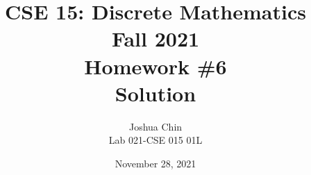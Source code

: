 \documentclass[11pt]{article}
\begin{document}
\author{Joshua Chin\\
Lab 021-CSE 015 01L}

\title{CSE 15: Discrete Mathematics\\
Fall 2021\\
Homework \#6\\
Solution}

\date{November 28, 2021}
\maketitle

\begin{enumerate}


\end{enumerate}
\end{document}
